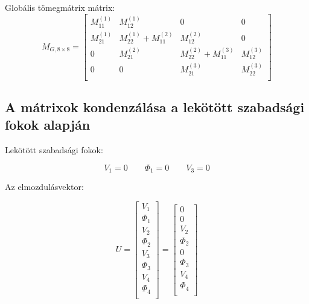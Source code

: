 \documentclass{article}
\begin{document}
			Globális tömegmátrix mátrix:
			\begin{equation}
				M_{G,8\times8}=
					\begin{bmatrix}
					M_{11}^{(1)} & M_{12}^{(1)}              & 0            			    & 0            \\
					M_{21}^{(1)} & M_{22}^{(1)}+M_{11}^{(2)} & M_{12}^{(2)}  			    & 0            \\
					0            & M_{21}^{(2)}              & M_{22}^{(2)} + M_{11}^{(3)}  & M_{12}^{(3)} \\
					0            & 0						 & M_{21}^{(3)} 					& M_{22}^{(3)} \\
					\end{bmatrix}
			\end{equation}
		
		
		\subsection{A mátrixok kondenzálása a lekötött szabadsági fokok alapján}
		
			Lekötött szabadsági fokok:
		
			\[V_{1}=0 \qquad \Phi_{1}=0 \qquad V_{3}=0\]	
		
			Az elmozdulásvektor:
		
			\begin{equation}
				U=
				\begin{bmatrix}
				V_{1}    \\
				\Phi_{1} \\
				V_{2}    \\
				\Phi_{2} \\
				V_{3}    \\
				\Phi_{3} \\
				V_{4}    \\
				\Phi_{4} \\
				\end{bmatrix}
				=
				\begin{bmatrix}
				0  \\
				0 \\
				V_{2}    \\
				\Phi_{2} \\
				0   \\
				\Phi_{3} \\
				V_{4}    \\
				\Phi_{4} \\
				\end{bmatrix}
			\end{equation}
			
\end{document}

